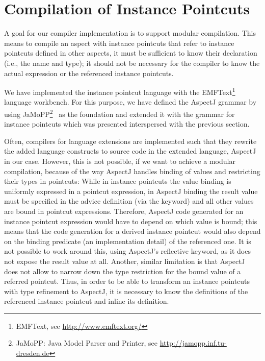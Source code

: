 \section{Compilation of Instance Pointcuts}
\label{sect:compilation}

A goal for our compiler implementation is to support modular compilation.
This means to compile an aspect with instance pointcuts that refer to instance pointcuts defined in other aspects, it must be sufficient to know their declaration (i.e., the name and type); it should not be necessary for the compiler to know the actual expression or the referenced instance pointcuts.

We have implemented the instance pointcut language with the EMFText\footnote{EMFText, see \url{http://www.emftext.org/}} language workbench.
For this purpose, we have defined the AspectJ grammar by using JaMoPP\footnote{JaMoPP: Java Model Parser and Printer, see \url{http://jamopp.inf.tu-dresden.de}}~\cite{jamopp2010} as the foundation and extended it with the grammar for instance pointcuts which was presented interspersed with the previous section.

Often, compilers for language extensions are implemented such that they rewrite the added language constructs to source code in the extended language, AspectJ in our case.
However, this is not possible, if we want to achieve a modular compilation, because of the way AspectJ handles binding of values and restricting their types in pointcuts:
While in instance pointcuts the value binding is uniformly expressed in a pointcut expression, in AspectJ binding the result value must be specified in the advice definition (via the  keyword) and all other values are bound in pointcut expressions.
Therefore, AspectJ code generated for an instance pointcut expression would have to depend on which value is bound; this means that the code generation for a derived instance pointcut would also depend on the binding predicate (an implementation detail) of the referenced one.
It is not possible to work around this, using AspectJ's reflective  keyword, as it does not expose the result value at all.
Another, similar limitation is that AspectJ does not allow to narrow down the type restriction for the bound value of a referred pointcut.
Thus, in order to be able to transform an instance pointcuts with type refinement to AspectJ, it is necessary to know the definitions of the referenced instance pointcut and inline its definition.

